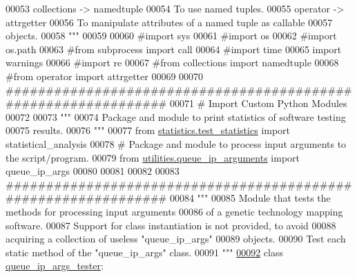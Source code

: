 \begin{DoxyCode}
00053 \textcolor{stringliteral}{    collections -> namedtuple}
00054 \textcolor{stringliteral}{                To use named tuples.}
00055 \textcolor{stringliteral}{    operator -> attrgetter}
00056 \textcolor{stringliteral}{                To manipulate attributes of a named tuple as callable}
00057 \textcolor{stringliteral}{                    objects.}
00058 \textcolor{stringliteral}{"""}
00059 
00060 \textcolor{comment}{#import sys}
00061 \textcolor{comment}{#import os}
00062 \textcolor{comment}{#import os.path}
00063 \textcolor{comment}{#from subprocess import call}
00064 \textcolor{comment}{#import time}
00065 \textcolor{keyword}{import} warnings
00066 \textcolor{comment}{#import re}
00067 \textcolor{comment}{#from collections import namedtuple}
00068 \textcolor{comment}{#from operator import attrgetter}
00069 
00070 \textcolor{comment}{###############################################################}
00071 \textcolor{comment}{#   Import Custom Python Modules}
00072 
00073 \textcolor{stringliteral}{"""}
00074 \textcolor{stringliteral}{    Package and module to print statistics of software testing}
00075 \textcolor{stringliteral}{        results.}
00076 \textcolor{stringliteral}{"""}
00077 \textcolor{keyword}{from} \hyperlink{namespacestatistics_1_1test__statistics}{statistics.test\_statistics} \textcolor{keyword}{import} statistical\_analysis
00078 \textcolor{comment}{# Package and module to process input arguments to the script/program.}
00079 \textcolor{keyword}{from} \hyperlink{namespaceutilities_1_1queue__ip__arguments}{utilities.queue\_ip\_arguments} \textcolor{keyword}{import} queue\_ip\_args
00080 
00081 
00082 
00083 \textcolor{comment}{###############################################################}
00084 \textcolor{stringliteral}{"""}
00085 \textcolor{stringliteral}{    Module that tests the methods for processing input arguments}
00086 \textcolor{stringliteral}{        of a genetic technology mapping software.}
00087 \textcolor{stringliteral}{    Support for class instantiation is not provided, to avoid}
00088 \textcolor{stringliteral}{        acquiring a collection of useless "queue\_ip\_args"}
00089 \textcolor{stringliteral}{        objects.}
00090 \textcolor{stringliteral}{    Test each static method of the "queue\_ip\_args" class.}
00091 \textcolor{stringliteral}{"""}
\hypertarget{queue__ip__arguments__tester_8py_source_l00092}{}\hyperlink{classutilities_1_1queue__ip__arguments__tester_1_1queue__ip__args__tester}{00092} \textcolor{keyword}{class }\hyperlink{classutilities_1_1queue__ip__arguments__tester_1_1queue__ip__args__tester}{queue\_ip\_args\_tester}:

\end{DoxyCode}
